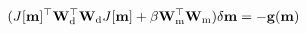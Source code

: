 \begin{equation}
(J[\mathbf{m}]^\top \mathbf{W}_{\rm d}^\top \mathbf{W}_{\rm d} J[\mathbf{m}] + \beta \mathbf{W}_{\rm m}^\top \mathbf{W}_{\rm m}) \delta \mathbf{m} = -\mathbf{g}(\mathbf{m})
\label{eq:gauss_newton}
\end{equation}
